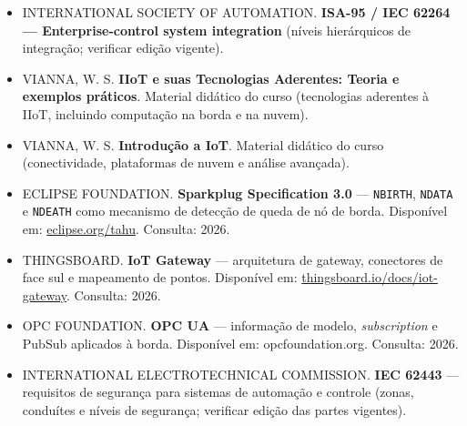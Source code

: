 \begin{itemize}
\tightlist
\item
  INTERNATIONAL SOCIETY OF AUTOMATION. \textbf{ISA-95 / IEC 62264 --- Enterprise-control system integration} (níveis hierárquicos de integração; verificar edição vigente).
\item
  VIANNA, W. S. \textbf{IIoT e suas Tecnologias Aderentes: Teoria e exemplos práticos}. Material didático do curso (tecnologias aderentes à IIoT, incluindo computação na borda e na nuvem).
\item
  VIANNA, W. S. \textbf{Introdução a IoT}. Material didático do curso (conectividade, plataformas de nuvem e análise avançada).
\item
  ECLIPSE FOUNDATION. \textbf{Sparkplug Specification 3.0} --- \passthrough{\lstinline!NBIRTH!}, \passthrough{\lstinline!NDATA!} e \passthrough{\lstinline!NDEATH!} como mecanismo de detecção de queda de nó de borda. Disponível em: \url{eclipse.org/tahu}. Consulta: 2026.
\item
  THINGSBOARD. \textbf{IoT Gateway} --- arquitetura de gateway, conectores de face sul e mapeamento de pontos. Disponível em: \url{thingsboard.io/docs/iot-gateway}. Consulta: 2026.
\item
  OPC FOUNDATION. \textbf{OPC UA} --- informação de modelo, \emph{subscription} e PubSub aplicados à borda. Disponível em: opcfoundation.org. Consulta: 2026.
\item
  INTERNATIONAL ELECTROTECHNICAL COMMISSION. \textbf{IEC 62443} --- requisitos de segurança para sistemas de automação e controle (zonas, conduítes e níveis de segurança; verificar edição das partes vigentes).
\end{itemize}
